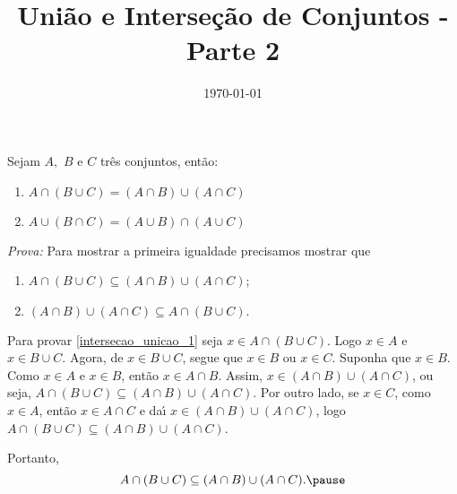 \documentclass{beamer}
\title{Uni\~ao e Interse\c{c}\~ao de Conjuntos - Parte 2}
\author[\autor]{\autor}
\institute[\instituto]{\instituto}
\date{\today}
\begin{document}
    \begin{frame}
        \maketitle
    \end{frame}


    \begin{frame}
        \begin{proposicao} Sejam $A,$ $B$ e $C$ tr{\^e}s conjuntos, ent{\~a}o:\pause
            \begin{enumerate}[label={\roman*})]
                \item $A \cap ( B \cup C) = (A \cap B) \cup (A \cap C)$\pause
                \item $A \cup (B \cap C) = (A \cup B) \cap (A \cup C)$\pause
            \end{enumerate}
        \end{proposicao}
        \textit{Prova:} \pause
        Para mostrar a primeira igualdade precisamos mostrar que\pause
        \begin{enumerate}[label=({\arabic*})]
            \item $A \cap (B \cup C) \subseteq (A \cap B) \cup ( A \cap C)$;\label{intersecao_unicao_1}\pause
            \item $(A \cap B) \cup (A \cap C) \subseteq A \cap (B \cup C).$\label{intersecao_unicao_2}\pause
        \end{enumerate}

        Para provar \ref{intersecao_unicao_1} seja $x\in A \cap (B \cup C)$. \pause Logo $x \in A$ \pause e $x \in B \cup C$. \pause Agora, de $x \in B \cup C$, \pause segue que $x \in B$ \pause ou $x \in C$. \pause Suponha que $x \in B$. \pause Como $x \in A$ e $x \in B$, \pause ent\~ao $x \in A \cap B$. \pause Assim, $x \in (A \cap B) \cup (A \cap C)$, \pause ou seja, $A \cap (B \cup C) \subseteq (A \cap B) \cup (A \cap C)$. \pause Por outro lado, se $x \in C$, \pause como $x \in A$, ent{\~a}o $x \in A \cap C$ \pause e da{\'\i} $x \in (A \cap B) \cup (A \cap C)$, \pause logo $A \cap (B \cup C)\subseteq (A \cap B) \cup (A \cap C)$.\pause

        Portanto,
        \[
            A \cap (B \cup C) \subseteq (A \cap B) \cup (A \cap C).\pause
        \]
    \end{frame}
\end{document}
